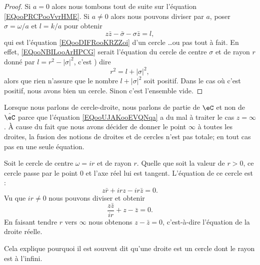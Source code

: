 \begin{proof}
	Si \( a=0\) alors nous tombons tout de suite sur l'équation \eqref{EQooPRCPooVvrHME}. Si \( a\neq 0\) alors nous pouvons diviser par \( a\), poser \( \sigma=\omega/a\) et \( l=k/a\) pour obtenir
	\begin{equation}        \label{EQooNBILooArHPCG}
		z\bar z-\bar\sigma-\sigma\bar z=l,
	\end{equation}
	qui est l'équation \eqref{EQooDIFRooKRZZoi} d'un cercle \ldots ou pas tout à fait. En effet, \eqref{EQooNBILooArHPCG} serait l'équation du cercle de centre \( \sigma\) et de rayon \( r\) donné par \( l=r^2-| \sigma |^2\), c'est ) dire
	\begin{equation}
		r^2=l+| \sigma |^2,
	\end{equation}
	alors que rien n'assure que le nombre \( l+| \sigma |^2\) soit positif. Dans le cas où c'est positif, nous avons bien un cercle. Sinon c'est l'ensemble vide.
\end{proof}

\begin{remark}      \label{REMooBMAEooHDvNID}
	Lorsque nous parlons de cercle-droite, nous parlons de partie de \( \eC\) et non de \( \hat \eC\) parce que l'équation \eqref{EQooUJAKooEVQNqa} a du mal à traiter le cas \( z=\infty\). À cause du fait que nous avons décider de donner le point \( \infty\) à toutes les droites, la fusion des notions de droites et de cercles n'est pas totale; en tout cas pas en une seule équation.
\end{remark}

\begin{example}      \label{EXooKFBIooOJKjGL}
	Soit le cercle de centre \( \omega=ir\) et de rayon \( r\). Quelle que soit la valeur de \( r>0\), ce cercle passe par le point \( 0\) et l'axe réel lui est tangent. L'équation de ce cercle est :
	\begin{equation}
		z\bar r+irz-ir\bar z=0.
	\end{equation}
	Vu que \( ir\neq 0\) nous pouvons diviser et obtenir
	\begin{equation}
		\frac{ z\bar z }{ ir }+z-\bar z=0.
	\end{equation}
	En faisant tendre \( r\) vers \( \infty\) nous obtenons \( z-\bar z=0\), c'est-à-dire l'équation de la droite réelle.

	Cela explique pourquoi il est souvent dit qu'une droite est un cercle dont le rayon est à l'infini.
\end{example}

